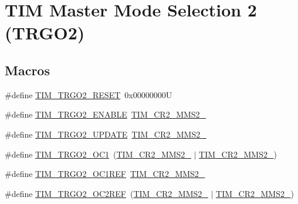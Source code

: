 \hypertarget{group___t_i_m___master___mode___selection__2}{}\section{T\+IM Master Mode Selection 2 (T\+R\+G\+O2)}
\label{group___t_i_m___master___mode___selection__2}
\subsection*{Macros}
\begin{DoxyCompactItemize}
\item 
\#define \mbox{\hyperlink{group___t_i_m___master___mode___selection__2_ga1cbae68386015bde2e2087787d31a77f}{T\+I\+M\+\_\+\+T\+R\+G\+O2\+\_\+\+R\+E\+S\+ET}}~0x00000000U
\item 
\#define \mbox{\hyperlink{group___t_i_m___master___mode___selection__2_gab9344703b3c1a7936f6b500a6bc26cb9}{T\+I\+M\+\_\+\+T\+R\+G\+O2\+\_\+\+E\+N\+A\+B\+LE}}~\mbox{\hyperlink{group___peripheral___registers___bits___definition_ga07efe60d8d7305b78085233ddaecb990}{T\+I\+M\+\_\+\+C\+R2\+\_\+\+M\+M\+S2\+\_}}
\item 
\#define \mbox{\hyperlink{group___t_i_m___master___mode___selection__2_ga7c09a032f333bd3c1896e53f8c476303}{T\+I\+M\+\_\+\+T\+R\+G\+O2\+\_\+\+U\+P\+D\+A\+TE}}~\mbox{\hyperlink{group___peripheral___registers___bits___definition_ga0248e35956d0d22ac66dcd67aab317c5}{T\+I\+M\+\_\+\+C\+R2\+\_\+\+M\+M\+S2\+\_}}
\item 
\#define \mbox{\hyperlink{group___t_i_m___master___mode___selection__2_ga6199721bcb0eb5f89dcd0b1055f7376f}{T\+I\+M\+\_\+\+T\+R\+G\+O2\+\_\+\+O\+C1}}~(\mbox{\hyperlink{group___peripheral___registers___bits___definition_ga0248e35956d0d22ac66dcd67aab317c5}{T\+I\+M\+\_\+\+C\+R2\+\_\+\+M\+M\+S2\+\_}} $\vert$ \mbox{\hyperlink{group___peripheral___registers___bits___definition_ga07efe60d8d7305b78085233ddaecb990}{T\+I\+M\+\_\+\+C\+R2\+\_\+\+M\+M\+S2\+\_}})
\item 
\#define \mbox{\hyperlink{group___t_i_m___master___mode___selection__2_gabe44de11cdf3f6d151b0d4a4945db092}{T\+I\+M\+\_\+\+T\+R\+G\+O2\+\_\+\+O\+C1\+R\+EF}}~\mbox{\hyperlink{group___peripheral___registers___bits___definition_gaa49670c71a446e5201994716b08b1527}{T\+I\+M\+\_\+\+C\+R2\+\_\+\+M\+M\+S2\+\_}}
\item 
\#define \mbox{\hyperlink{group___t_i_m___master___mode___selection__2_gaaa5b56f4c834853ccf048399f77fbb3b}{T\+I\+M\+\_\+\+T\+R\+G\+O2\+\_\+\+O\+C2\+R\+EF}}~(\mbox{\hyperlink{group___peripheral___registers___bits___definition_gaa49670c71a446e5201994716b08b1527}{T\+I\+M\+\_\+\+C\+R2\+\_\+\+M\+M\+S2\+\_}} $\vert$ \mbox{\hyperlink{group___peripheral___registers___bits___definition_ga07efe60d8d7305b78085233ddaecb990}{T\+I\+M\+\_\+\+C\+R2\+\_\+\+M\+M\+S2\+\_}})

\end{DoxyCompactItemize}

